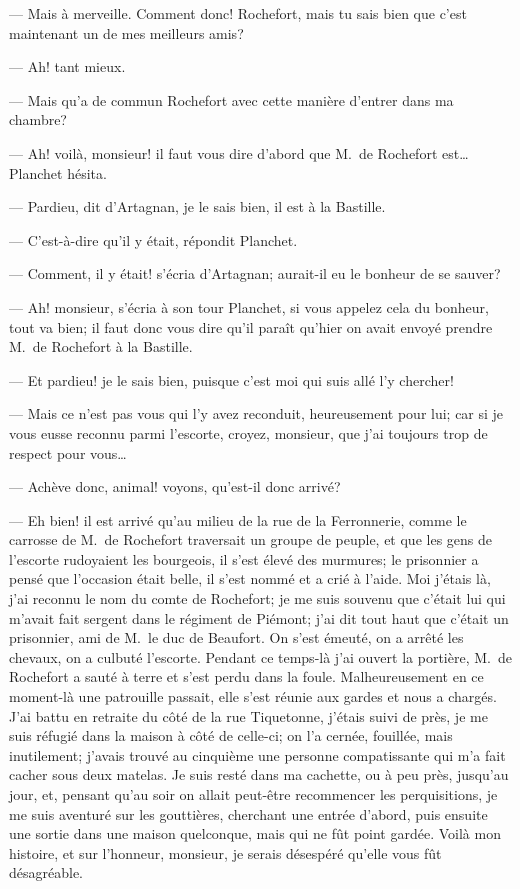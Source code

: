 — Mais à merveille. Comment donc! Rochefort, mais tu sais bien que c'est maintenant un de mes meilleurs amis?

— Ah! tant mieux.

— Mais qu'a de commun Rochefort avec cette manière d'entrer dans ma chambre?

— Ah! voilà, monsieur! il faut vous dire d'abord que M.~de Rochefort est\dots
Planchet hésita.

— Pardieu, dit d'Artagnan, je le sais bien, il est à la Bastille.

— C'est-à-dire qu'il y était, répondit Planchet.

— Comment, il y était! s'écria d'Artagnan; aurait-il eu le bonheur de se sauver?

— Ah! monsieur, s'écria à son tour Planchet, si vous appelez cela du bonheur, tout va bien; il faut donc vous dire qu'il paraît qu'hier on avait envoyé prendre M.~de Rochefort à la Bastille.

— Et pardieu! je le sais bien, puisque c'est moi qui suis allé l'y chercher!

— Mais ce n'est pas vous qui l'y avez reconduit, heureusement pour lui; car si je vous eusse reconnu parmi l'escorte, croyez, monsieur, que j'ai toujours trop de respect pour vous\dots

— Achève donc, animal! voyons, qu'est-il donc arrivé?

— Eh bien! il est arrivé qu'au milieu de la rue de la Ferronnerie, comme le carrosse de M.~de Rochefort traversait un groupe de peuple, et que les gens de l'escorte rudoyaient les bourgeois, il s'est élevé des murmures; le prisonnier a pensé que l'occasion était belle, il s'est nommé et a crié à l'aide. Moi j'étais là, j'ai reconnu le nom du comte de Rochefort; je me suis souvenu que c'était lui qui m'avait fait sergent dans le régiment de Piémont; j'ai dit tout haut que c'était un prisonnier, ami de M.~le duc de Beaufort. On s'est émeuté, on a arrêté les chevaux, on a culbuté l'escorte. Pendant ce temps-là j'ai ouvert la portière, M.~de Rochefort a sauté à terre et s'est perdu dans la foule. Malheureusement en ce moment-là une patrouille passait, elle s'est réunie aux gardes et nous a chargés. J'ai battu en retraite du côté de la rue Tiquetonne, j'étais suivi de près, je me suis réfugié dans la maison à côté de celle-ci; on l'a cernée, fouillée, mais inutilement; j'avais trouvé au cinquième une personne compatissante qui m'a fait cacher sous deux matelas. Je suis resté dans ma cachette, ou à peu près, jusqu'au jour, et, pensant qu'au soir on allait peut-être recommencer les perquisitions, je me suis aventuré sur les gouttières, cherchant une entrée d'abord, puis ensuite une sortie dans une maison quelconque, mais qui ne fût point gardée. Voilà mon histoire, et sur l'honneur, monsieur, je serais désespéré qu'elle vous fût désagréable.

